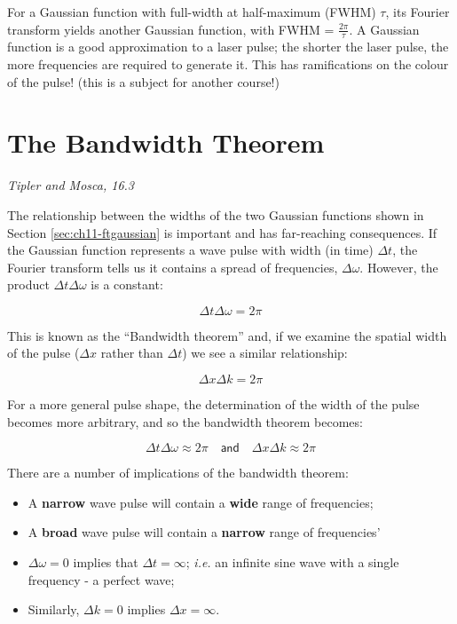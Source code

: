 \documentclass[
]{book}
\providecommand{\tightlist}{%
  \setlength{\itemsep}{0pt}\setlength{\parskip}{0pt}}
\begin{document}
For a Gaussian function with full-width at half-maximum (FWHM) \(\tau\), its Fourier transform yields another Gaussian function, with FWHM = \(\frac{2\pi}{\tau}\). A Gaussian function is a good approximation to a laser pulse; the shorter the laser pulse, the more frequencies are required to generate it. This has ramifications on the colour of the pulse! (this is a subject for another course!)

\hypertarget{sec:ch11-bandwidththeorem}{%
\section{The Bandwidth Theorem}\label{sec:ch11-bandwidththeorem}}

\emph{Tipler and Mosca, 16.3}

The relationship between the widths of the two Gaussian functions shown in Section \ref{sec:ch11-ftgaussian} is important and has far-reaching consequences. If the Gaussian function represents a wave pulse with width (in time) \(\Delta t\), the Fourier transform tells us it contains a spread of frequencies, \(\Delta \omega\). However, the product \(\Delta t \Delta \omega\) is a constant:

\begin{equation}
\Delta t \Delta \omega = 2\pi
\end{equation}

This is known as the ``Bandwidth theorem'' and, if we examine the spatial width of the pulse (\(\Delta x\) rather than \(\Delta t\)) we see a similar relationship:

\begin{equation}
\Delta x \Delta k = 2\pi
\end{equation}

For a more general pulse shape, the determination of the width of the pulse becomes more arbitrary, and so the bandwidth theorem becomes:

\begin{equation}
\Delta t \Delta \omega \approx 2\pi \quad \textsf{and} \quad \Delta x \Delta k \approx 2\pi
\end{equation}

There are a number of implications of the bandwidth theorem:

\begin{itemize}
\tightlist
\item
  A \textbf{narrow} wave pulse will contain a \textbf{wide} range of frequencies;
\item
  A \textbf{broad} wave pulse will contain a \textbf{narrow} range of frequencies'
\item
  \(\Delta \omega = 0\) implies that \(\Delta t = \infty\); \emph{i.e.} an infinite sine wave with a single frequency - a perfect wave;
\item
  Similarly, \(\Delta k = 0\) implies \(\Delta x = \infty\).
\end{itemize}
\end{document}
